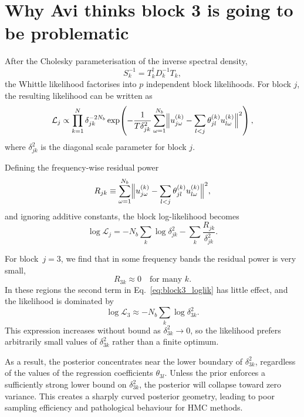 
\section{Why Avi thinks block 3 is going to be problematic}

After the Cholesky parameterisation of the inverse spectral density,
\begin{equation}
S_k^{-1} = T_k^\dagger D_k^{-1} T_k ,
\end{equation}
the Whittle likelihood factorises into $p$ independent block likelihoods.
For block $j$, the resulting likelihood can be written as
\begin{equation}
\mathcal{L}_j \propto
\prod_{k=1}^N \delta_{jk}^{-2N_b}
\exp\!\left(
-\frac{1}{T\delta_{jk}^2}
\sum_{\omega=1}^{N_b}
\Bigl\|
u_{j\omega}^{(k)} - \sum_{l<j} \theta_{jl}^{(k)} u_{l\omega}^{(k)}
\Bigr\|^2
\right),
\end{equation}
where $\delta_{jk}^2$ is the diagonal scale parameter for block $j$.

Defining the frequency-wise residual power
\begin{equation}
R_{jk} \equiv
\sum_{\omega=1}^{N_b}
\Bigl\|
u_{j\omega}^{(k)} - \sum_{l<j} \theta_{jl}^{(k)} u_{l\omega}^{(k)}
\Bigr\|^2 ,
\end{equation}
and ignoring additive constants, the block log-likelihood becomes
\begin{equation}
\log \mathcal{L}_j
=
- N_b \sum_k \log \delta_{jk}^2
- \sum_k \frac{R_{jk}}{\delta_{jk}^2}.
\label{eq:block3_loglik}
\end{equation}

For block~$j=3$, we find that in some frequency bands the residual power is very small,
\begin{equation}
R_{3k} \approx 0 \quad \text{for many } k .
\end{equation}
In these regions the second term in Eq.~\eqref{eq:block3_loglik} has little effect, and the likelihood is dominated by
\begin{equation}
\log \mathcal{L}_3
\approx
- N_b \sum_k \log \delta_{3k}^2 .
\end{equation}
This expression increases without bound as $\delta_{3k}^2 \to 0$, so the likelihood prefers arbitrarily small values of $\delta_{3k}^2$ rather than a finite optimum.

As a result, the posterior concentrates near the lower boundary of $\delta_{3k}^2$, regardless of the values of the regression coefficients $\theta_{3l}$.
Unless the prior enforces a sufficiently strong lower bound on $\delta_{3k}^2$, the posterior will collapse toward zero variance.
This creates a sharply curved posterior geometry, leading to poor sampling efficiency and pathological behaviour for HMC methods.

